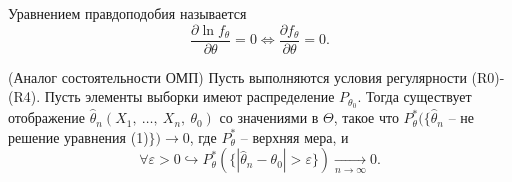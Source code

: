 \begin{definition}
    Уравнением правдоподобия называется
    \begin{equation}
        \dfrac{\partial \ln f_{\theta }}{\partial \theta } =0\Leftrightarrow \dfrac{\partial f_{\theta }}{\partial \theta } =0.
    \end{equation}
\end{definition}
\begin{theorem}
    (Аналог состоятельности ОМП) Пусть выполняются условия регулярности (R0)-(R4). Пусть элементы выборки имеют распределение $\displaystyle P_{\theta _{0}}$. Тогда существует отображение $\displaystyle \hat{\theta }_{n}( X_{1} ,\ \dotsc ,\ X_{n} ,\ \theta _{0})$ со значениями в $\displaystyle \Theta $, такое что $\displaystyle P_{\theta }^{*}(\{\hat{\theta }_{n}$ -- не решение уравнения (1)$\displaystyle \})\rightarrow 0$, где $\displaystyle P_{\theta }^{*}$ -- верхняя мера, и
    \begin{equation*}
        \forall \varepsilon  >0\hookrightarrow P_{\theta }^{*}(\{| \hat{\theta }_{n} -\theta _{0}|  >\varepsilon \})\xrightarrow[n\rightarrow \infty ]{} 0.
    \end{equation*}
\end{theorem}
